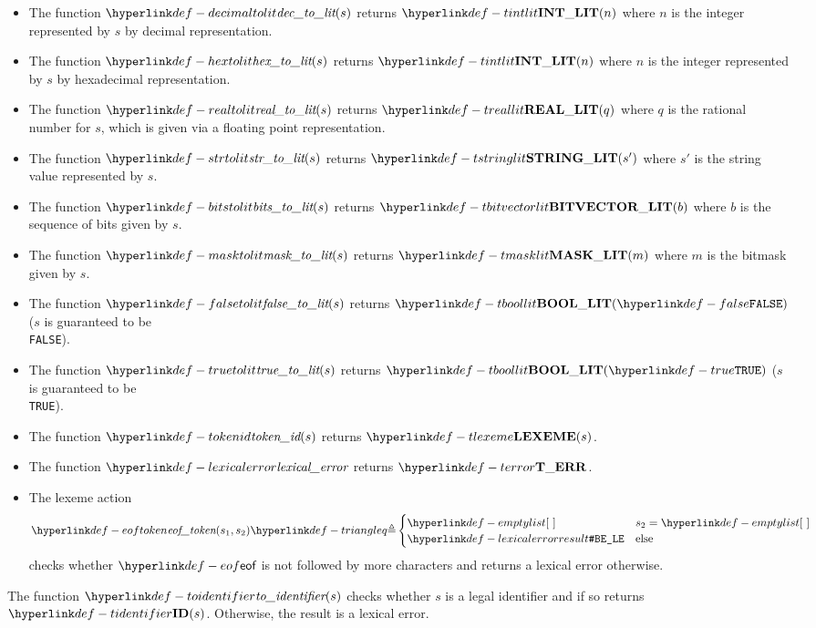 \begin{itemize}
\hypertarget{def-decimaltolit}{}
\item The function $\decimaltolit(s)$ returns $\Tintlit(n)$ where $n$ is the integer represented by $s$
by decimal representation.
\hypertarget{def-hextolit}{}
\item The function $\hextolit(s)$ returns $\Tintlit(n)$ where $n$ is the integer represented by $s$
by hexadecimal representation.
\hypertarget{def-realtolit}{}
\item The function $\realtolit(s)$ returns $\Treallit(q)$ where $q$ is the rational number for
$s$, which is given via a floating point representation.
\hypertarget{def-strtolit}{}
\item The function $\strtolit(s)$ returns $\Tstringlit(s')$ where $s'$ is the string value represented by $s$.
\hypertarget{def-bitstolit}{}
\item The function $\bitstolit(s)$ returns $\Tbitvectorlit(b)$ where $b$ is the sequence of bits
      given by $s$.
\hypertarget{def-masktolit}{}
\item The function $\masktolit(s)$ returns $\Tmasklit(m)$ where $m$ is the bitmask given by $s$.
\hypertarget{def-falsetolit}{}
\item The function $\falsetolit(s)$ returns $\Tboollit(\False)$ ($s$ is guaranteed to be \\
      \texttt{FALSE}).
\hypertarget{def-truetolit}{}
\item The function $\truetolit(s)$ returns $\Tboollit(\True)$ ($s$ is guaranteed to be \\
      \texttt{TRUE}).
\hypertarget{def-tokenid}{}
\item The function $\tokenid(s)$ returns $\Tlexeme(s)$.
\hypertarget{def-lexicalerror}{}
\item The function $\lexicalerror$ returns $\Terror$.
\hypertarget{def-eoftoken}{}
\item The lexeme action
\[
\eoftoken(s_1, s_2) \triangleq \begin{cases}
  \emptylist & s_2 = \emptylist\\
  \LexicalErrorConfig & \text{else}
\end{cases}
\]
checks whether $\eof$ is not followed by more characters and returns a lexical error otherwise.
\end{itemize}

\hypertarget{def-toidentifier}{}
The function $\toidentifier(s)$ checks whether $s$ is a legal identifier
and if so returns $\Tidentifier(s)$. Otherwise, the result is a lexical error.

